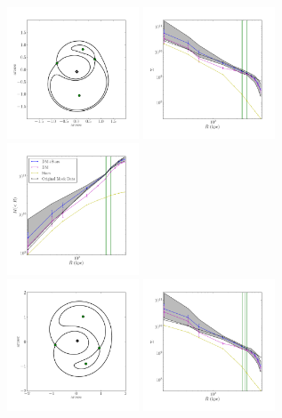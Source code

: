 \documentclass[galley,usenatbib]{mn2e}
\begin{document}
\begin{figure}
  \includegraphics[width=0.35\textwidth]{BCQuadR1a_TmS-a.pdf}\hspace{-2em}
  \includegraphics[width=0.35\textwidth]{BCQuadR1a_TmS-b.pdf}\hspace{-2em}
  \includegraphics[width=0.35\textwidth]{BCQuadR1a_TmS-c.pdf}\\\vspace{-1em}
  \includegraphics[width=0.35\textwidth]{ACQuadR1a_TmS-a.pdf}\hspace{-2em}
  \includegraphics[width=0.35\textwidth]{ACQuadR1a_TmS-b.pdf}\hspace{-2em}

\end{figure}
\end{document}
